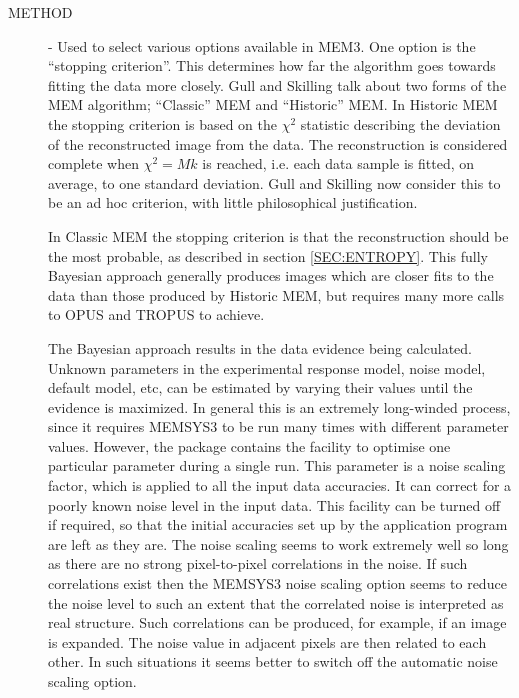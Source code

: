 \begin {description}

\item [METHOD] - Used to select various options available in MEM3. One option
is  the ``stopping criterion''. This determines how far the algorithm goes
towards  fitting the data more closely. Gull and Skilling talk about two forms
of the MEM  algorithm; ``Classic'' MEM and ``Historic'' MEM. In Historic MEM
the stopping  criterion is based on the $\chi^2$ statistic describing the
deviation of the  reconstructed image from the data. The reconstruction is
considered complete  when $\chi^{2}=Mk$ is reached, i.e. each data sample is
fitted, on average, to  one standard deviation. Gull and Skilling now consider
this to be an ad hoc  criterion, with little philosophical justification.

In Classic MEM the stopping criterion is that the reconstruction should be the
most probable, as described in section \ref {SEC:ENTROPY}. This  fully
Bayesian approach generally produces images which are closer fits to the data
than those produced by Historic MEM, but requires many more calls to OPUS and
TROPUS to achieve.

The Bayesian approach results in the data evidence being calculated. Unknown
parameters in the experimental response model, noise model, default model, etc,
can be estimated by varying their values until the evidence is maximized.  In
general this is an extremely long-winded process, since it requires MEMSYS3 to
be run many times with different parameter values. However, the package
contains  the facility to optimise one particular parameter during a single
run. This  parameter is a noise scaling factor, which is applied to all the
input data  accuracies. It can correct for a poorly known noise level in the
input data. This facility can be turned off if required, so that the initial
accuracies set  up by the application program are left as they are. The noise
scaling seems to  work extremely well so long as there are no strong
pixel-to-pixel  correlations in the noise. If such correlations exist then the
MEMSYS3 noise  scaling option seems to reduce the noise level to such an extent
that the  correlated noise is interpreted as real structure. Such correlations
can be  produced, for example, if an image is expanded. The noise value in
adjacent  pixels are then related to each other. In such situations it seems
better to  switch off the automatic noise scaling option.


\end{description}
